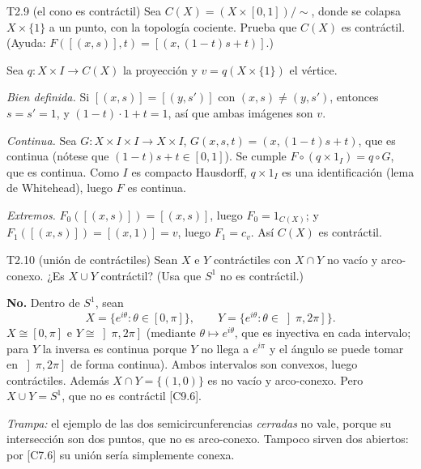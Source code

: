 \begin{ejercicio}{T2.9 (el cono es contráctil)}
Sea $C(X) = (X \times [0,1])/\!\sim$, donde se colapsa $X \times \{1\}$ a un punto, con la topología cociente. Prueba que $C(X)$ es contráctil. (Ayuda: $F([(x,s)],t) = [(x,(1-t)s+t)]$.)

\sol \fuentepropia

Sea $q \colon X \times I \to C(X)$ la proyección y $v = q(X \times \{1\})$ el vértice.

\emph{Bien definida.} Si $[(x,s)] = [(y,s')]$ con $(x,s) \neq (y,s')$, entonces $s = s' = 1$, y $(1-t)\cdot 1 + t = 1$, así que ambas imágenes son $v$.

\emph{Continua.} Sea $G \colon X \times I \times I \to X \times I$, $G(x,s,t) = (x,(1-t)s+t)$, que es continua (nótese que $(1-t)s + t \in [0,1]$). Se cumple $F \circ (q \times 1_I) = q \circ G$, que es continua. Como $I$ es compacto Hausdorff, $q \times 1_I$ es una identificación (lema de Whitehead), luego $F$ es continua.

\emph{Extremos.} $F_0([(x,s)]) = [(x,s)]$, luego $F_0 = 1_{C(X)}$; y $F_1([(x,s)]) = [(x,1)] = v$, luego $F_1 = c_v$. Así $C(X)$ es contráctil.
\end{ejercicio}

\begin{ejercicio}{T2.10 (unión de contráctiles)}
Sean $X$ e $Y$ contráctiles con $X \cap Y$ no vacío y arco-conexo. ¿Es $X \cup Y$ contráctil? (Usa que $S^1$ no es contráctil.)

\sol \fuentepropia

\textbf{No.} Dentro de $S^1$, sean
\[ X = \{e^{i\theta} : \theta \in [0,\pi]\}, \qquad Y = \{e^{i\theta} : \theta \in \left]\pi, 2\pi\right]\}. \]
$X \cong [0,\pi]$ e $Y \cong \left]\pi,2\pi\right]$ (mediante $\theta \mapsto e^{i\theta}$, que es inyectiva en cada intervalo; para $Y$ la inversa es continua porque $Y$ no llega a $e^{i\pi}$ y el ángulo se puede tomar en $\left]\pi,2\pi\right]$ de forma continua). Ambos intervalos son convexos, luego contráctiles. Además $X \cap Y = \{(1,0)\}$ es no vacío y arco-conexo. Pero $X \cup Y = S^1$, que no es contráctil [C9.6].

\emph{Trampa:} el ejemplo de las dos semicircunferencias \emph{cerradas} no vale, porque su intersección son dos puntos, que no es arco-conexo. Tampoco sirven dos abiertos: por [C7.6] su unión sería simplemente conexa.
\end{ejercicio}

